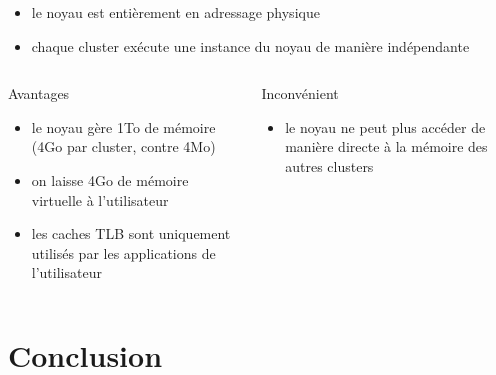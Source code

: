 \documentclass[t]{beamer}
\begin{document}
      \begin{frame}{\subsecname}
        \begin{itemize}
          \item le noyau est entièrement en adressage physique
          \item chaque cluster exécute une instance du noyau de manière
            indépendante
        \end{itemize}
          \begin{columns}[T]
            \begin{column}[T]{5cm}
              \begin{exampleblock}{Avantages}
              \begin{itemize}
                \item le noyau gère 1To de mémoire (4Go par cluster, contre 4Mo)
                \item on laisse 4Go de mémoire virtuelle à l'utilisateur
                \item les caches TLB sont uniquement utilisés par les
                  applications de l'utilisateur
              \end{itemize}
            \end{exampleblock}
          \end{column}
          \begin{column}[T]{5cm}
            \begin{alertblock}{Inconvénient}
              \begin{itemize}
                \item le noyau ne peut plus accéder de manière directe à la
                  mémoire des autres clusters
              \end{itemize}
            \end{alertblock}
          \end{column}
        \end{columns}
      \end{frame}

  \section{Conclusion}
\end{document}
